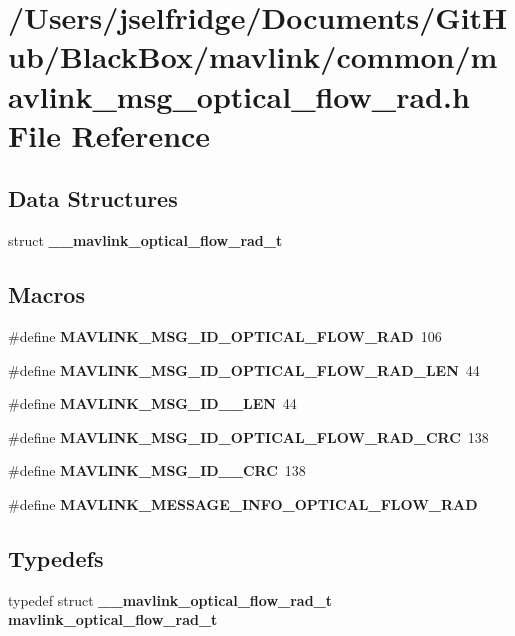 \section{/\+Users/jselfridge/\+Documents/\+Git\+Hub/\+Black\+Box/mavlink/common/mavlink\+\_\+msg\+\_\+optical\+\_\+flow\+\_\+rad.h File Reference}
\label{mavlink__msg__optical__flow__rad_8h}
\subsection*{Data Structures}
\begin{DoxyCompactItemize}
\item 
struct \textbf{ \+\_\+\+\_\+mavlink\+\_\+optical\+\_\+flow\+\_\+rad\+\_\+t}
\end{DoxyCompactItemize}
\subsection*{Macros}
\begin{DoxyCompactItemize}
\item 
\#define \textbf{ M\+A\+V\+L\+I\+N\+K\+\_\+\+M\+S\+G\+\_\+\+I\+D\+\_\+\+O\+P\+T\+I\+C\+A\+L\+\_\+\+F\+L\+O\+W\+\_\+\+R\+AD}~106
\item 
\#define \textbf{ M\+A\+V\+L\+I\+N\+K\+\_\+\+M\+S\+G\+\_\+\+I\+D\+\_\+\+O\+P\+T\+I\+C\+A\+L\+\_\+\+F\+L\+O\+W\+\_\+\+R\+A\+D\+\_\+\+L\+EN}~44
\item 
\#define \textbf{ M\+A\+V\+L\+I\+N\+K\+\_\+\+M\+S\+G\+\_\+\+I\+D\+\_\+\_\+\+L\+EN}~44
\item 
\#define \textbf{ M\+A\+V\+L\+I\+N\+K\+\_\+\+M\+S\+G\+\_\+\+I\+D\+\_\+\+O\+P\+T\+I\+C\+A\+L\+\_\+\+F\+L\+O\+W\+\_\+\+R\+A\+D\+\_\+\+C\+RC}~138
\item 
\#define \textbf{ M\+A\+V\+L\+I\+N\+K\+\_\+\+M\+S\+G\+\_\+\+I\+D\+\_\+\_\+\+C\+RC}~138
\item 
\#define \textbf{ M\+A\+V\+L\+I\+N\+K\+\_\+\+M\+E\+S\+S\+A\+G\+E\+\_\+\+I\+N\+F\+O\+\_\+\+O\+P\+T\+I\+C\+A\+L\+\_\+\+F\+L\+O\+W\+\_\+\+R\+AD}
\end{DoxyCompactItemize}
\subsection*{Typedefs}
\begin{DoxyCompactItemize}
\item 
typedef struct \textbf{ \+\_\+\+\_\+mavlink\+\_\+optical\+\_\+flow\+\_\+rad\+\_\+t} \textbf{ mavlink\+\_\+optical\+\_\+flow\+\_\+rad\+\_\+t}
\end{DoxyCompactItemize}


